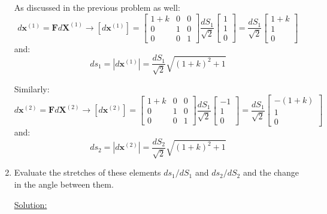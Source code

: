 \documentclass{article}
\newcommand{\ee}{\end{equation}}
\newcommand{\be}{\begin{equation}}
\newcommand{\bs}{\boldsymbol}
\newif\ifsolution
\begin{document}
\begin{enumerate}
As discussed in the previous problem as well:
\be
d\bs{x}^{(1)}=\bs{F}d\bs{X}^{(1)} \to [d\bs{x}^{(1)}] = \left[\begin{array}{lll}  1+k & 0 & 0 \\ 0 & 1 & 0 \\ 0 & 0 & 1                
               \end{array}
\right] \frac{dS_1}{\sqrt{2}} \left[\begin{array}{l} 1 \\1 \\0 \end{array} \right] =\frac{dS_1}{\sqrt{2}} 
\left[\begin{array}{l} 1+k \\1 \\0 \end{array} \right]
\ee
and:
\be
ds_1=|d\bs{x}^{(1)}|=\frac{dS_1}{\sqrt{2}} \sqrt{(1+k)^2+1}
\ee


Similarly:
\be
d\bs{x}^{(2)}=\bs{F}d\bs{X}^{(2)} \to [d\bs{x}^{(2)}] = \left[\begin{array}{lll}  1+k & 0 & 0 \\ 0 & 1 & 0 \\ 0 & 0 & 1                
               \end{array}
\right] \frac{dS_1}{\sqrt{2}} \left[\begin{array}{l} -1 \\1 \\0 \end{array} \right] =\frac{dS_1}{\sqrt{2}} 
\left[\begin{array}{l} -(1+k) \\1 \\0 \end{array} \right]
\ee
and:
\be
ds_2=|d\bs{x}^{(2)}|=\frac{dS_2}{\sqrt{2}} \sqrt{(1+k)^2+1}
\ee
\fi
\item  Evaluate the stretches of these elements $ds_1/dS_1$ and $ds_2/dS_2$ and the change in the angle between them.

\ifsolution
\underline{Solution:}


\end{enumerate}
\end{document}
